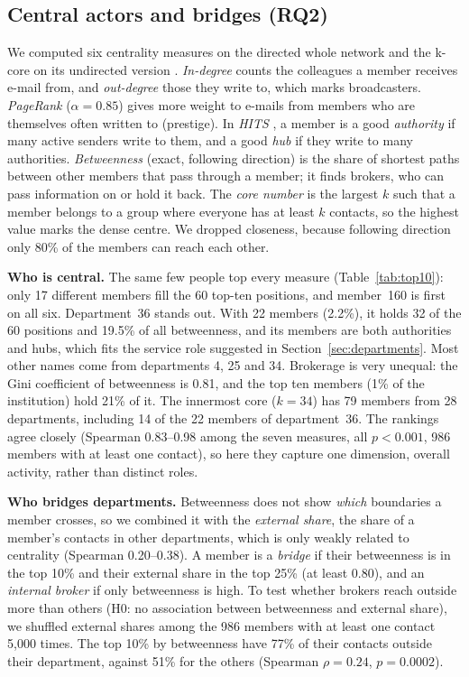 \documentclass[12pt, a4paper]{article}
\begin{document}
\FloatBarrier

\subsection{Central actors and bridges (RQ2)}
\label{sec:centrality}

We computed six centrality measures on the directed whole network and the
k-core on its undirected version \cite{newman2018,borgatti2018}.
\emph{In-degree} counts the colleagues a member receives e-mail from, and
\emph{out-degree} those they write to, which marks broadcasters.
\emph{PageRank} \cite{brin1998} ($\alpha=0.85$) gives more weight to e-mails
from members who are themselves often written to (prestige). In \emph{HITS}
\cite{kleinberg1999}, a member is a good \emph{authority} if many active
senders write to them, and a good \emph{hub} if they write to many
authorities. \emph{Betweenness} \cite{freeman1977} (exact, following
direction) is the share of shortest paths between other members that pass
through a member; it finds brokers, who can pass information on or hold it
back. The \emph{core number} is the largest $k$ such that a member belongs to a
group where everyone has at least $k$ contacts, so the highest value marks the
dense centre. We dropped closeness, because following direction only 80\% of
the members can reach each other.

\textbf{Who is central.} The same few people top every measure
(Table~\ref{tab:top10}): only 17 different members fill the 60 top-ten
positions, and member~160 is first on all six. Department~36 stands out. With
22 members (2.2\%), it holds 32 of the 60 positions and 19.5\% of all
betweenness, and its members are both authorities and hubs, which fits the
service role suggested in Section~\ref{sec:departments}. Most other names come
from departments 4, 25 and 34. Brokerage is very unequal: the Gini coefficient
of betweenness is 0.81, and the top ten members (1\% of the institution) hold
21\% of it. The innermost core ($k=34$) has 79 members from 28 departments,
including 14 of the 22 members of department~36. The rankings agree closely
(Spearman 0.83--0.98 among the seven measures, all $p<0.001$, 986 members with
at least one contact), so here they capture one dimension, overall activity,
rather than distinct roles.

\textbf{Who bridges departments.} Betweenness does not show \emph{which}
boundaries a member crosses, so we combined it with the \emph{external share},
the share of a member's contacts in other departments, which is only weakly
related to centrality (Spearman 0.20--0.38). A member is a \emph{bridge} if
their betweenness is in the top 10\% and their external share in the top 25\%
(at least 0.80), and an \emph{internal broker} if only betweenness is high. To
test whether brokers reach outside more than others (H0: no association between
betweenness and external share), we shuffled external shares among the 986
members with at least one contact 5{,}000 times. The top 10\% by betweenness
have 77\% of their contacts outside their department, against 51\% for the
others (Spearman $\rho=0.24$, $p=0.0002$).
\end{document}
